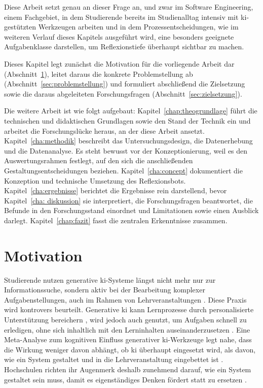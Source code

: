 Diese Arbeit setzt genau an dieser Frage an, und zwar im Software Engineering, einem Fachgebiet, in
dem Studierende bereits im Studienalltag intensiv mit \acrshort{ki}-gestützten Werkzeugen arbeiten und
in dem Prozessentscheidungen, wie im weiteren Verlauf dieses Kapitels ausgeführt wird, eine besonders
geeignete Aufgabenklasse darstellen, um Reflexionstiefe überhaupt sichtbar zu machen.

Dieses Kapitel legt zunächst die Motivation für die vorliegende Arbeit dar
(Abschnitt~\ref{sec:motivation}), leitet daraus die konkrete Problemstellung ab
(Abschnitt~\ref{sec:problemstellung}) und formuliert abschließend die Zielsetzung sowie die daraus
abgeleiteten Forschungsfragen (Abschnitt~\ref{sec:zielsetzung}).

Die weitere Arbeit ist wie folgt aufgebaut: Kapitel~\ref{chap:theogrundlage} führt die technischen
und didaktischen Grundlagen sowie den Stand der Technik ein und arbeitet die Forschungslücke heraus,
an der diese Arbeit ansetzt. Kapitel~\ref{cha:methodik} beschreibt das Untersuchungsdesign, die Datenerhebung
und die Datenanalyse. Es steht bewusst vor der Konzeptionierung, weil es den Auswertungsrahmen
festlegt, auf den sich die anschließenden Gestaltungsentscheidungen beziehen.
Kapitel~\ref{cha:concept} dokumentiert die Konzeption und technische Umsetzung des Reflexionsbots.
Kapitel~\ref{cha:ergebnisse} berichtet die Ergebnisse rein darstellend, bevor
Kapitel~\ref{cha: diskussion} sie interpretiert, die Forschungsfragen beantwortet, die Befunde in den
Forschungsstand einordnet und Limitationen sowie einen Ausblick darlegt.
Kapitel~\ref{chap:fazit} fasst die zentralen Erkenntnisse zusammen.

\section{Motivation}
\label{sec:motivation}

Studierende nutzen generative \acrshort{ki}-Systeme längst nicht mehr nur zur Informationssuche,
sondern aktiv bei der Bearbeitung komplexer Aufgabenstellungen, auch im Rahmen von Lehrveranstaltungen
\cite{nikolicChatGPTCopilotGemini2024, jwairGenerativeArtificialIntelligence2025}. Diese Praxis wird
kontrovers beurteilt. Generative \acrshort{ki} kann Lernprozesse durch personalisierte Unterstützung
bereichern \cite{baidoo-anuEducationEraGenerative2023}, wird jedoch auch genutzt, um Aufgaben schnell
zu erledigen, ohne sich inhaltlich mit den Lerninhalten auseinanderzusetzen
\cite{francisGenerativeAIHigher2025, cottonChattingCheatingEnsuring2024}. Eine Meta-Analyse zum
kognitiven Einfluss generativer \acrshort{ki}-Werkzeuge legt nahe, dass die Wirkung weniger davon abhängt,
ob \acrshort{ki} überhaupt eingesetzt wird, als davon, wie ein System gestaltet und in die
Lehrveranstaltung eingebettet ist \cite{GenerativeAITools}. Hochschulen richten ihr Augenmerk deshalb
zunehmend darauf, wie ein System gestaltet sein muss, damit es eigenständiges Denken fördert statt zu
ersetzen \cite{chanComprehensiveAIPolicy2023}.

